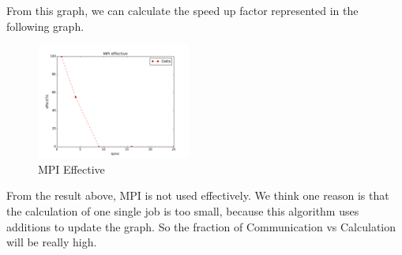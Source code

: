 From this graph, we can calculate the speed up factor represented in the following graph.
\begin{figure}[H]
    \centering
    \includegraphics[width=0.45\textwidth]{figs/MPI_effective.png}
    \caption{MPI Effective}
\end{figure}

From the result above, MPI is not used effectively. We think one reason is that the calculation of
one single job is too small, because this algorithm uses additions to update the graph. So the
fraction of Communication vs Calculation will be really high. \\
